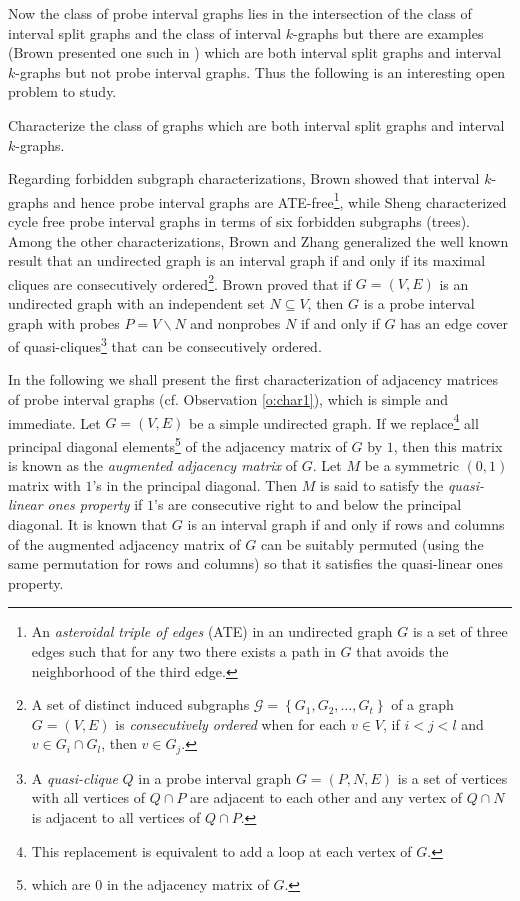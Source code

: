 \documentclass[secthm]{elsart}
\newcommand{\set}[1]{\left\{#1\right\}}
\begin{document}
Now the class of probe interval graphs lies in the intersection of the class of interval split graphs and the class of interval $k$-graphs but there are examples (Brown presented one such in \cite{Br}) which are both interval split graphs and interval $k$-graphs but not probe interval graphs. Thus the following is an interesting open problem to study.

\begin{prob}
Characterize the class of graphs which are both interval split graphs and interval $k$-graphs.
\end{prob}

Regarding forbidden subgraph characterizations, Brown \cite{Br} showed that interval $k$-graphs and hence probe interval graphs are ATE-free\footnote{An {\em asteroidal triple of edges} (ATE) in an undirected graph $G$ is a set of three edges such that for any two there exists a path in $G$ that avoids the neighborhood of the third edge.}, while Sheng \cite{LS} characterized cycle free probe interval graphs in terms of six forbidden subgraphs (trees). Among the other characterizations, Brown \cite{Br} and Zhang \cite{Z} generalized the well known \cite{GH,G} result that an undirected graph is an interval graph if and only if its maximal cliques are consecutively ordered\footnote{A set of distinct induced subgraphs $\mathcal{G}=\set{G_1,G_2,\ldots,G_t}$ of a graph $G=(V,E)$ is {\em consecutively ordered} when for each $v\in V$, if $i<j<l$ and $v\in G_i\cap G_l$, then $v\in G_j$.}. Brown \cite{Br} proved that if $G=(V,E)$ is an undirected graph with an independent set $N\subseteq V$, then $G$ is a probe interval graph with probes $P=V\smallsetminus N$ and nonprobes $N$ if and only if $G$ has an edge cover of quasi-cliques\footnote{A {\em quasi-clique} $Q$ in a probe interval graph $G=(P,N,E)$ is a set of vertices with all vertices of $Q\cap P$ are adjacent to each other and any vertex of $Q\cap N$ is adjacent to all vertices of $Q\cap P$.} that can be consecutively ordered. 

In the following we shall present the first characterization of adjacency matrices of probe interval graphs (cf. Observation \ref{o:char1}), which is simple and immediate. Let $G=(V,E)$ be a simple undirected graph. If we replace\footnote{This replacement is equivalent to add a loop at each vertex of $G$.} all principal diagonal elements\footnote{which are $0$ in the adjacency matrix of $G$.} of the adjacency matrix of $G$ by $1$, then this matrix is known as the {\em \label{'augmented'} augmented adjacency matrix} of $G$. Let $M$ be a symmetric $(0,1)$ matrix with $1$'s in the principal diagonal. Then $M$ is said to satisfy the {\em quasi-linear ones property} if $1$'s are consecutive right to and below the principal diagonal. It is known \cite{MR} that $G$ is an interval graph if and only if rows and columns of the augmented adjacency matrix of $G$ can be suitably permuted (using the same permutation for rows and columns) so that it satisfies the quasi-linear ones property.
\end{document}
